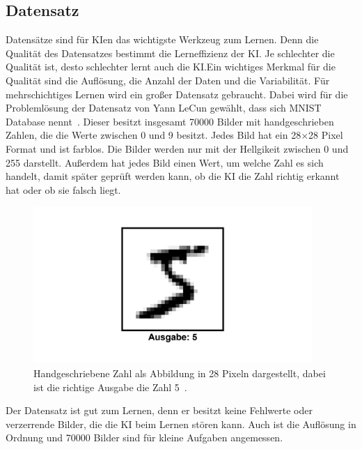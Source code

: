 \documentclass[11pt]{article}
\begin{document}
\subsection{Datensatz}
Datensätze sind für KIen das wichtigste Werkzeug zum Lernen. Denn die Qualität des Datensatzes bestimmt die Lerneffizienz der KI.\@
Je schlechter die Qualität ist, desto schlechter lernt auch die KI.\@ Ein wichtiges Merkmal für die Qualität sind die Auflösung, die Anzahl der Daten und die Variabilität.
Für mehrschichtiges Lernen wird ein großer Datensatz gebraucht. Dabei wird für die Problemlösung der Datensatz von Yann LeCun gewählt, dass sich MNIST Database nennt~\cite{3}.
Dieser besitzt insgesamt 70000 Bilder mit handgeschrieben Zahlen, die die Werte zwischen 0 und 9 besitzt. Jedes Bild hat ein 28$\times$28 Pixel
Format und ist farblos. Die Bilder werden nur mit der Hellgikeit zwischen 0 und 255 darstellt. Außerdem hat jedes Bild einen Wert, um welche Zahl
es sich handelt, damit später geprüft werden kann, ob die KI die Zahl richtig erkannt hat oder ob sie falsch liegt.
\begin{figure}[h]
    \centering
    \includegraphics[width=300pt, keepaspectratio]{images/number}
    \caption[Handgeschriebene Zahl 5~\cite{3}]{Handgeschriebene Zahl als Abbildung in 28 Pixeln dargestellt, dabei ist die richtige Ausgabe die Zahl 5~\cite{3}.}
\end{figure}
Der Datensatz ist gut zum Lernen, denn er besitzt keine Fehlwerte oder verzerrende Bilder, die die KI beim Lernen stören kann. Auch ist die
Auflösung in Ordnung und 70000 Bilder sind für kleine Aufgaben angemessen. %
\end{document}
